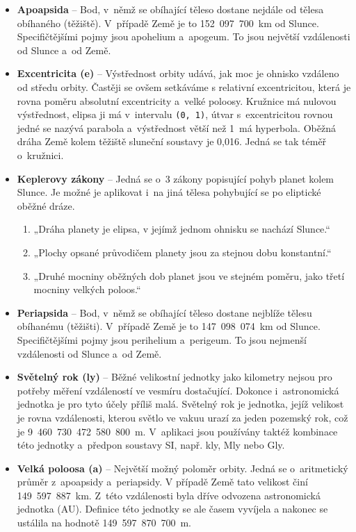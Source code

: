 \documentclass[a4paper,12pt]{article}
\def\code#1{\texttt{#1}}
\begin{document}
\begin{itemize}
\item \textbf{Apoapsida} -- Bod, v~němž se obíhající těleso dostane nejdále od tělesa obíhaného (těžiště). V~případě Země je to 152~097~700~km od Slunce. Specifičtějšími pojmy jsou apohelium a~apogeum. To jsou největší vzdálenosti od Slunce a~od Země.~\cite{kleczek}

\item \textbf{Excentricita (e)} -- Výstřednost orbity udává, jak moc je ohnisko vzdáleno od středu orbity. Častěji se ovšem setkáváme s relativní excentricitou, která je rovna poměru absolutní excentricity a~velké poloosy. Kružnice má nulovou výstřednost, elipsa ji má v~intervalu \code{(0,~1)}, útvar s~excentricitou rovnou jedné se nazývá parabola a~výstřednost větší než 1~má hyperbola. Oběžná dráha Země kolem těžiště sluneční soustavy je 0,016. Jedná se tak téměř o~kružnici.~\cite{kleczek}

\item \textbf{Keplerovy zákony} -- Jedná se o~3 zákony popisující pohyb planet kolem Slunce. Je možné je aplikovat i~na jiná tělesa pohybující se po eliptické oběžné dráze.

\begin{enumerate}
\item „Dráha planety je elipsa, v jejímž jednom ohnisku se nachází Slunce.“
\item „Plochy opsané průvodičem planety jsou za stejnou dobu konstantní.“
\item „Druhé mocniny oběžných dob planet jsou ve stejném poměru, jako třetí mocniny velkých poloos.“
\end{enumerate}

\item \textbf{Periapsida} -- Bod, v~němž se obíhající těleso dostane nejblíže tělesu obíhanému (těžišti). V~případě Země je to 147~098~074~km od Slunce. Specifičtějšími pojmy jsou perihelium a~perigeum. To jsou nejmenší vzdálenosti od Slunce a~od Země.~\cite{kleczek}

\item \textbf{Světelný rok (ly)} -- Běžné velikostní jednotky jako kilometry nejsou pro potřeby měření vzdáleností ve vesmíru dostačující. Dokonce i~astronomická jednotka je pro tyto účely příliš malá. Světelný rok je jednotka, jejíž velikost je rovna vzdálenosti, kterou světlo ve vakuu urazí za jeden pozemský rok, což je 9~460~730~472~580~800~m. V~aplikaci jsou používány taktéž kombinace této jednotky a~předpon soustavy SI, např. kly, Mly nebo Gly.~\cite{kleczek}

\item \textbf{Velká poloosa (a)} -- Největší možný poloměr orbity. Jedná se o~aritmetický průměr z~apoapsidy a~periapsidy. V případě Země tato velikost činí 149~597~887~km. Z~této vzdálenosti byla dříve odvozena astronomická jednotka (AU). Definice této jednotky se ale časem vyvíjela a nakonec se ustálila na hodnotě 149~597~870~700~m.~\cite{kleczek}
\end{itemize}
\end{document}
